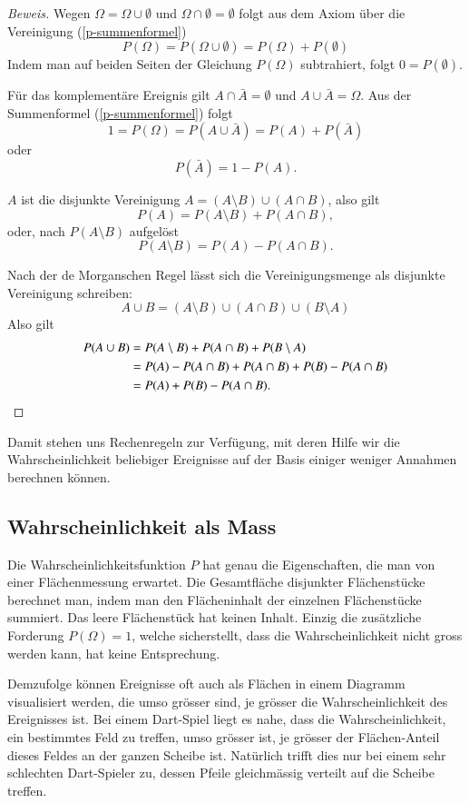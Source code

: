 \begin{proof}[Beweis]
Wegen $\Omega = \Omega \cup\emptyset$ und
$\Omega\cap\emptyset = \emptyset$ folgt aus dem Axiom
über die Vereinigung  (\ref{p-summenformel})
\[
P(\Omega) = P(\Omega \cup \emptyset) = P(\Omega) + P(\emptyset)
\]
Indem man auf beiden Seiten der Gleichung $P(\Omega)$ subtrahiert,
folgt $0 = P(\emptyset)$.

Für das komplementäre Ereignis gilt $A\cap\bar A=\emptyset$ und
$A\cup\bar A=\Omega$.
Aus der Summenformel (\ref{p-summenformel}) folgt
\[
1 = P(\Omega) = P(A\cup\bar A) = P(A) + P(\bar A)
\]
oder
\[
P(\bar A) = 1 - P(A).
\]

$A$ ist die disjunkte Vereinigung $A=(A\setminus B) \cup (A\cap B)$,
also gilt
\[
P(A)=P(A\setminus B) + P(A\cap B),
\]
oder, nach $P(A\setminus B)$ aufgelöst
\[
P(A\setminus B) = P(A) - P(A\cap B).
\]

Nach der de Morganschen Regel lässt sich die Vereinigungsmenge
als disjunkte Vereinigung schreiben:
\[
A\cup B =  (A\setminus B) \cup (A\cap B) \cup (B\setminus A)
\]
Also gilt
\begin{align*}
P(A\cup B)&=P(A\setminus B) + P(A\cap B) + P(B\setminus A)\\
&=P(A) - P(A\cap B) + P(A\cap B) + P(B) - P(A\cap B)\\
&=P(A) + P(B) - P(A\cap B).
\qedhere
\end{align*}
\end{proof}
Damit stehen uns Rechenregeln zur Verfügung, mit deren Hilfe wir
die Wahrscheinlichkeit beliebiger Ereignisse auf der Basis einiger
weniger Annahmen berechnen können.

\subsection{Wahrscheinlichkeit als Mass}
Die Wahrscheinlichkeitsfunktion $P$ hat genau die Eigenschaften,
die man von einer Flächenmessung erwartet.
Die Gesamtfläche disjunkter Flächenstücke berechnet man,
indem man den Flächeninhalt der einzelnen Flächenstücke summiert.
Das leere Flächenstück hat keinen Inhalt.
Einzig die zusätzliche Forderung $P(\Omega)=1$, welche
sicherstellt, dass die Wahrscheinlichkeit nicht gross werden kann,
hat keine Entsprechung.

Demzufolge können Ereignisse oft auch als Flächen in einem Diagramm
visualisiert werden,
die umso grösser sind, je grösser die Wahrscheinlichkeit des Ereignisses
ist.
Bei einem Dart-Spiel liegt es nahe, dass die Wahrscheinlichkeit, ein
bestimmtes Feld zu treffen, umso grösser ist, je grösser der Flächen-Anteil
dieses Feldes an der ganzen Scheibe ist.
Natürlich trifft dies nur bei einem
sehr schlechten Dart-Spieler zu, dessen Pfeile gleichmässig verteilt auf
die Scheibe treffen.

